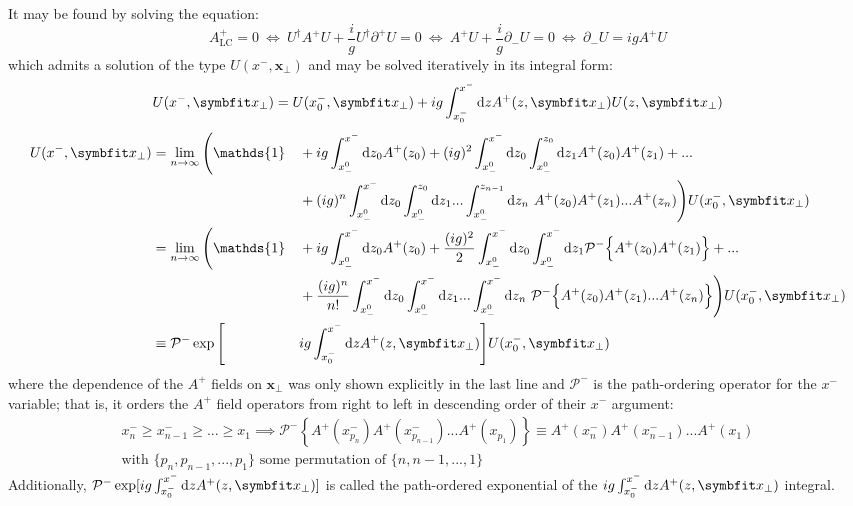 It may be found by solving the equation:
\begin{equation}
	A_{\text{LC}}^{+}=0 ~ \Leftrightarrow ~ U^\dagger A^+ U + \frac{i}{g} U^\dagger \partial^+ U = 0 ~ \Leftrightarrow ~ A^+ U + \frac{i}{g} \partial_- U = 0 ~ \Leftrightarrow ~ \partial_- U = ig A^+ U
\end{equation}
which admits a solution of the type $U(x^-,\mathbf{x}_\perp)$ and may be solved iteratively in its integral form:
\begin{gather}
	U(x^-,\mathbf{x}_\perp) = U(x^-_0, \mathbf{x}_\perp) + ig \int_{x^-_0}^{x^-} \diff z A^+ (z, \mathbf{x}_\perp) U (z, \mathbf{x}_\perp)
\end{gather}
\begin{alignat}{2}
	U(x^-,\mathbf{x}_\perp) & = \lim_{n \to \infty} \Bigg( \mathds{1}
	&& + ig\int_{x^0_-}^{x^-}  \diff z_0 A^+ (z_0)
	+ (ig)^2\int_{x^0_-}^{x^-} \diff z_0 \int_{x^0_-}^{z_0} \diff z_1 A^+ (z_0) A^+ (z_1) + ... \nonumber \\
	& && + (ig)^n\int_{x^0_-}^{x^-} \diff z_0  \int_{x^0_-}^{z_0} \diff z_1 ...  \int_{x^0_-}^{z_{n-1}} \diff z_n ~ A^+ (z_0) A^+ (z_1) ...  A^+ (z_n)
	\Bigg) U(x_0^-,\mathbf{x}_\perp) \nonumber \\
	& = \lim_{n \to \infty} \Bigg( \mathds{1}
	&& + ig\int_{x^0_-}^{x^-}  \diff z_0 A^+ (z_0)
	+ \frac{(ig)^2}{2} \int_{x^0_-}^{x^-} \diff z_0 \int_{x^0_-}^{x^-} \diff z_1  \mathcal{P}^- \Big \{ A^+ (z_0) A^+ (z_1) \Big \} + ... \nonumber \\
	& && + \frac{(ig)^n}{n!}\int_{x^0_-}^{x^-} \diff z_0  \int_{x^0_-}^{x^-} \diff z_1 ...  \int_{x^0_-}^{x^-} \diff z_n ~ \mathcal{P}^- \Big \{ A^+ (z_0) A^+ (z_1) ...  A^+ (z_n) \Big \}
	\Bigg) U(x_0^-,\mathbf{x}_\perp) \nonumber \\
	& \equiv \mathcal{P}^- \exp  \Bigg[&& ig \int_{x^-_0}^{x^-} \diff z A^+ (z, \mathbf{x}_\perp) \Bigg] U(x_0^-,\mathbf{x}_\perp)
\end{alignat}
where the dependence of the $A^+$ fields on $\mathbf{x}_\perp$ was only shown explicitly in the last line and $\mathcal{P}^-$ is the path-ordering operator for the $x^-$ variable; that is, it orders the $A^+$ field operators from right to left in descending order of their $x^-$ argument:
\begin{gather}
	x^-_n \geq x^-_{n-1} \geq ... \geq x_1 \implies \mathcal{P}^- \left \{A^+(x^-_{p_n}) A^+(x^-_{p_{n-1}}) ... A^+(x_{p_1}) \right \} \equiv A^+(x^-_n) A^+(x^-_{n-1}) ... A^+(x_1) \\
	\text{with $\{p_n, p_{n-1}, ..., p_1\}$ some permutation of $\{n, n-1, ..., 1\}$} \nonumber
\end{gather}
Additionally,  $\mathcal{P}^-\exp[ig\int_{x^-_0}^{x^-} \diff z A^+ (z, \mathbf{x}_\perp)]$ is called the path-ordered exponential of the $ig\int_{x^-_0}^{x^-} \diff z A^+ (z, \mathbf{x}_\perp)$ integral.


